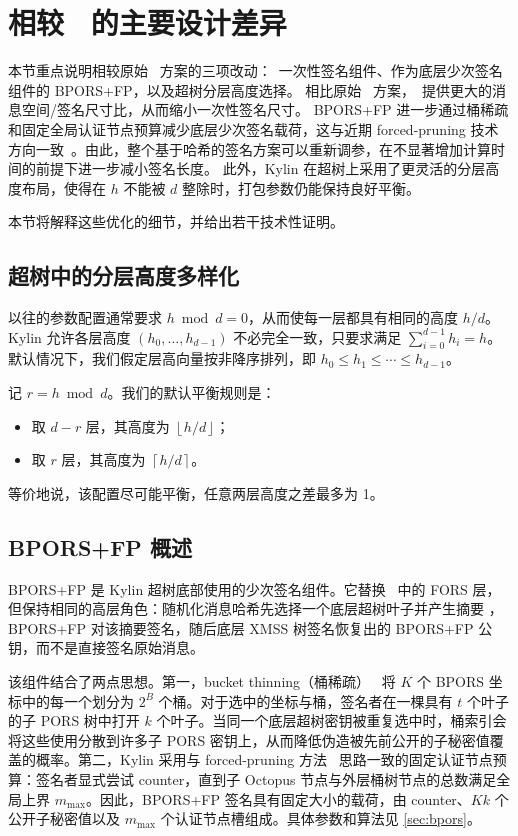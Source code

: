 \section{相较 \SPHINCSP\ 的主要设计差异} \label{sec:balanced wotsp}\label{sec:wots-optimization}

本节重点说明相较原始 \SPHINCSP\ 方案的三项改动：\WOTSCS\ 一次性签名组件、作为底层少次签名组件的 BPORS+FP，以及超树分层高度选择。
相比原始 \WOTSP\ 方案，\WOTSCS\ 提供更大的消息空间/签名尺寸比，从而缩小一次性签名尺寸。
BPORS+FP 进一步通过桶稀疏和固定全局认证节点预算减少底层少次签名载荷，这与近期 forced-pruning 技术方向一致~\cite{bucketthinning,EPRINT:AbrKat25}。由此，整个基于哈希的签名方案可以重新调参，在不显著增加计算时间的前提下进一步减小签名长度。
此外，Kylin 在超树上采用了更灵活的分层高度布局，使得在 $h$ 不能被 $d$ 整除时，打包参数仍能保持良好平衡。

本节将解释这些优化的细节，并给出若干技术性证明。

\subsection{超树中的分层高度多样化}

以往的参数配置通常要求 $h \bmod d = 0$，从而使每一层都具有相同的高度 $h/d$。Kylin 允许各层高度 $(h_0,\ldots,h_{d-1})$ 不必完全一致，只要求满足 $\sum_{i=0}^{d-1} h_i = h$。默认情况下，我们假定层高向量按非降序排列，即 $h_0 \le h_1 \le \cdots \le h_{d-1}$。

记 $r = h \bmod d$。我们的默认平衡规则是：
\begin{itemize}
    \item 取 $d-r$ 层，其高度为 $\left\lfloor h/d \right\rfloor$；
    \item 取 $r$ 层，其高度为 $\left\lceil h/d \right\rceil$。
\end{itemize}
等价地说，该配置尽可能平衡，任意两层高度之差最多为 1。

\subsection{BPORS+FP 概述}

BPORS+FP 是 Kylin 超树底部使用的少次签名组件。它替换
\SPHINCSP\ 中的 FORS 层，但保持相同的高层角色：随机化消息哈希先选择一个底层超树叶子并产生摘要 \md，BPORS+FP 对该摘要签名，随后底层 XMSS 树签名恢复出的 BPORS+FP 公钥，而不是直接签名原始消息。

该组件结合了两点思想。第一，bucket thinning（桶稀疏）~\cite{bucketthinning}
将 $K$ 个 BPORS 坐标中的每一个划分为 $2^B$ 个桶。对于选中的坐标与桶，签名者在一棵具有 $t$ 个叶子的子 PORS 树中打开 $k$ 个叶子。当同一个底层超树密钥被重复选中时，桶索引会将这些使用分散到许多子 PORS 密钥上，从而降低伪造被先前公开的子秘密值覆盖的概率。第二，Kylin 采用与 forced-pruning 方法~\cite{EPRINT:AbrKat25} 思路一致的固定认证节点预算：签名者显式尝试 counter，直到子 Octopus 节点与外层桶树节点的总数满足全局上界 $m_{\max}$。因此，BPORS+FP 签名具有固定大小的载荷，由 counter、$Kk$ 个公开子秘密值以及 $m_{\max}$ 个认证节点槽组成。具体参数和算法见 \cref{sec:bpors}。

